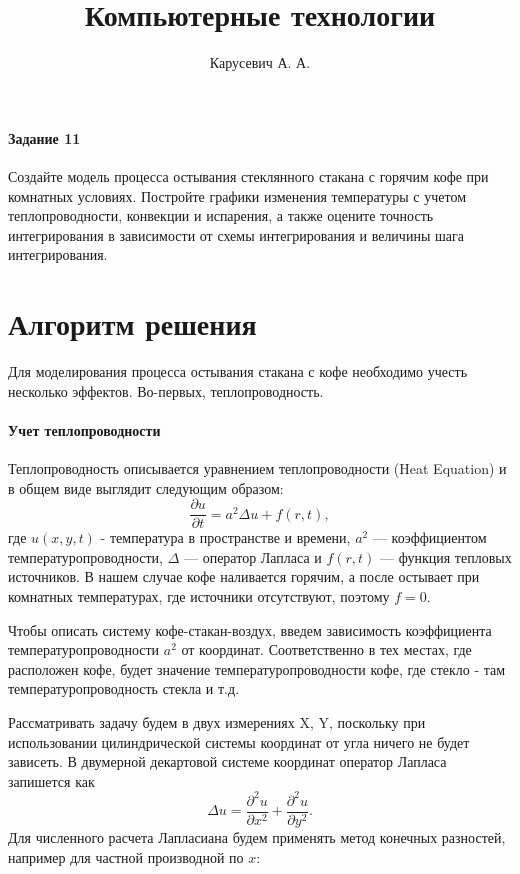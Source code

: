 



\title{Компьютерные технологии}
\author{Карусевич А. А.}
\date{}




\maketitle

\paragraph{Задание 11} Создайте модель процесса остывания стеклянного стакана с горячим кофе при 
комнатных условиях. Постройте графики изменения температуры с учетом теплопроводности, 
конвекции и испарения, а также оцените точность интегрирования в зависимости от схемы 
интегрирования и величины шага интегрирования.


\section{Алгоритм решения}
Для моделирования процесса остывания стакана с кофе необходимо учесть несколько эффектов. Во-первых, теплопроводность. 

\paragraph{Учет теплопроводности} Теплопроводность описывается уравнением
теплопроводности (Heat Equation) и в общем виде выглядит следующим образом:
\begin{equation}
	\frac{\partial u}{\partial t} = a^2 \Delta u + f(r,t),
\end{equation}
где $u(x,y,t)$ - температура в пространстве и времени, $a^2$ —  коэффициентом температуропроводности, $\Delta$ — оператор Лапласа и $f(r,t)$ — функция тепловых источников. 
В нашем случае кофе наливается горячим, а после остывает при комнатных
температурах, где источники отсутствуют, поэтому $f = 0$.

Чтобы описать систему кофе-стакан-воздух, введем зависимость коэффициента температуропроводности $a^2$ от координат. Соответственно в тех местах,
где расположен кофе, будет значение температуропроводности кофе, где стекло - там температуропроводность стекла и т.д.


Рассматривать задачу будем в двух измерениях X, Y, поскольку при использовании цилиндрической системы координат от
угла ничего не будет зависеть.
В двумерной декартовой системе координат оператор Лапласа запишется как
\begin{equation}
	\Delta u = \frac{\partial^2 u}{\partial x^2} + \frac{\partial^2 u}{\partial
    y^2}.
\end{equation}
Для численного расчета Лапласиана будем применять метод конечных разностей, например для частной производной по $x$:


